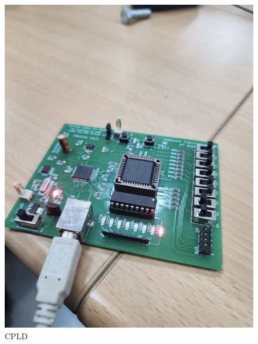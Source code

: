 \documentclass[12pt]{article}
\begin{document}
   \newpage 
    \begin{multicols}{2}
    
    \columnbreak
    \end{multicols}

     \begin{figure}[h!]
        \centering
        \includegraphics[width=0.5\linewidth]{cpld.png}
        \caption{CPLD}
        \label{fig:enter-label}
    \end{figure}
    
\end{document}
